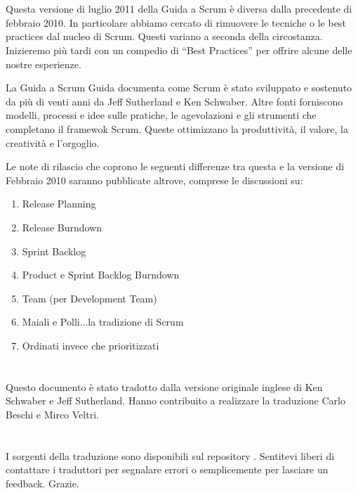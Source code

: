 \newpage
\section*{\color{Blue}{Revisioni}}
\label{sec:revisions}
Questa versione di luglio 2011 della Guida a Scrum è diversa dalla precedente di febbraio 2010. In particolare abbiamo cercato di rimuovere le tecniche o le best practices dal nucleo di Scrum. Questi variano a seconda della circostanza. Inizieremo pi\`u tardi con un compedio di ``Best Practices'' per offrire alcune delle nostre esperienze.

La Guida a Scrum Guida documenta come Scrum \`e stato sviluppato e sostenuto da pi\`u di venti anni da Jeff Sutherland e Ken Schwaber. Altre fonti forniscono modelli, processi e idee sulle pratiche, le agevolazioni e gli strumenti che completano il framewok Scrum. Queste ottimizzano la produttività, il valore, la creatività e l'orgoglio.

Le note di rilascio che coprono le seguenti differenze tra questa e la versione di Febbraio 2010 saranno pubblicate altrove, comprese le discussioni su:

\begin{enumerate}
 	\item Release Planning
	\item Release Burndown
	\item Sprint Backlog
	\item Product e Sprint Backlog Burndown
	\item Team (per Development Team)
	\item Maiali e Polli...la tradizione di Scrum
	\item Ordinati invece che prioritizzati 
\end{enumerate}

\newpage
\section*{\color{Blue}{Traduzione}}
\label{sec:translation}
Questo documento \`e stato tradotto dalla versione originale inglese di Ken Schwaber e Jeff Sutherland. Hanno contribuito a realizzare la traduzione Carlo Beschi e Mirco Veltri.

\section*{\color{Blue}{Note alla versione italiana}}
\label{sec:transnotes}
I sorgenti della traduzione sono disponibili sul repository . 
Sentitevi liberi di contattare i traduttori per segnalare errori o semplicemente per lasciare un feedback. Grazie.

